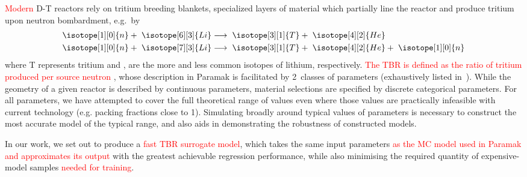 \textcolor{red}{Modern} D-T reactors rely on tritium breeding blankets, specialized
layers of material which partially line the reactor and produce tritium upon
neutron bombardment, e.g.~by 
\begin{eqnarray}
	\isotope[1][0]{n} + \hspace{3pt} \isotope[6][3]{Li} 
	&\longrightarrow \hspace{3pt} 
	\isotope[3][1]{T} + \hspace{3pt}\isotope[4][2]{He} \\
	\isotope[1][0]{n} + \hspace{3pt} \isotope[7][3]{Li} 
	&\longrightarrow \hspace{3pt} 
	\isotope[3][1]{T} + \hspace{3pt} \isotope[4][2]{He} + \hspace{3pt} \isotope[1][0]{n}
\end{eqnarray}%
where T represents tritium and ,  are the more and
less common isotopes of lithium, respectively. \textcolor{red}{The TBR is defined as the ratio of tritium produced per source neutron}
, whose description in Paramak is facilitated by 2~classes of parameters
(exhaustively listed in~). While the geometry of a given
reactor is described by continuous parameters, material selections are specified
by discrete categorical parameters. For all parameters, we have attempted to cover the full theoretical range of values even where those values are practically infeasible with current technology (e.g. packing fractions close to 1). Simulating broadly around typical values of parameters is necessary to construct the most accurate model of the typical range, and also aids in demonstrating the robustness of constructed models.

In our work, we set out to produce a \textcolor{red}{fast TBR surrogate model}, which takes the same input parameters \textcolor{red}{as the MC model used in Paramak and approximates its output} with the greatest achievable regression performance, while also minimising the required quantity of expensive-model samples \textcolor{red}{needed for training}.

